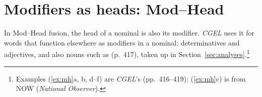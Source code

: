 %

\section{Modifiers as heads: Mod--Head}\label{sec:mod-head}

In Mod--Head fusion, the head of a nominal is also its modifier. \textit{CGEL} uses it for words that function elsewhere as modifiers in a nominal: determinatives and adjectives, and also nouns such as  (p.~417), taken up in Section~\ref{sec:analyses}.\footnote{Examples (\ref{ex:mh}a, b, d--f) are \textit{CGEL}'s (pp.~416--419); (\ref{ex:mh}c) is from NOW (\textit{National Observer}).}

